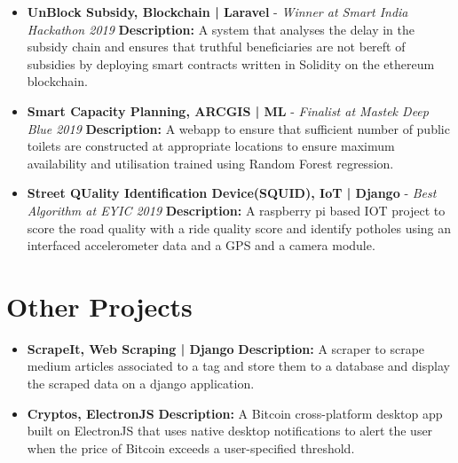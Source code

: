 \documentclass[11pt,a4paper]{moderncv}
\begin{document}
\begin{itemize}	
	
	\item\textbf{UnBlock Subsidy, Blockchain | Laravel} - \textit{Winner at Smart India Hackathon 2019}
	\textbf{Description:}
	A system that analyses the delay in the subsidy chain and ensures that truthful beneficiaries are not bereft of subsidies by deploying smart contracts written in Solidity on the ethereum blockchain.

\item\textbf{Smart Capacity Planning, ARCGIS | ML} - \textit{Finalist at Mastek Deep Blue 2019}
	\textbf{Description:}
	A webapp to ensure that sufficient number of public toilets are constructed at appropriate locations to ensure maximum availability and utilisation trained using Random Forest regression.

\item\textbf{Street QUality Identification Device(SQUID),  IoT | Django} - \textit{Best Algorithm at EYIC 2019}
	\textbf{Description:}
	A raspberry pi based IOT project to score the road quality with a ride quality score and identify potholes using an interfaced accelerometer data and a GPS and a camera module.
	
\end{itemize}

\section{Other Projects}
\begin{itemize}	
	
	\item\textbf{ScrapeIt, Web Scraping | Django}
	\textbf{Description:}
	A scraper to scrape medium articles associated to a tag and store them to a database and display the scraped data on a django application.
		
	\item\textbf{Cryptos, ElectronJS}
	\textbf{Description:}
	A Bitcoin cross-platform desktop app built on ElectronJS that uses native desktop notifications to alert the user when the price of Bitcoin exceeds a user-specified threshold.
	
\end{itemize}

\end{document}
